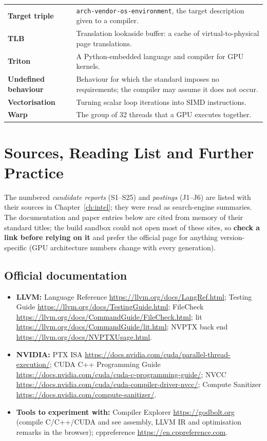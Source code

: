\documentclass[10pt,a4paper,openany,oneside]{report}
\begin{document}
\begin{center}
\begin{xltabular}{\textwidth}{@{}L{3.6cm}Y@{}}
\textbf{Target triple} & \texttt{arch-vendor-os-environment}, the target description given to a compiler.\\
\textbf{TLB} & Translation lookaside buffer: a cache of virtual-to-physical page translations.\\
\textbf{Triton} & A Python-embedded language and compiler for GPU kernels.\\
\textbf{Undefined behaviour} & Behaviour for which the standard imposes no requirements; the compiler may assume it does not occur.\\
\textbf{Vectorisation} & Turning scalar loop iterations into SIMD instructions.\\
\textbf{Warp} & The group of 32 threads that a GPU executes together.\\
\bottomrule
\end{xltabular}
\end{center}


\chapter{Sources, Reading List and Further Practice}
\label{app:read}

\begin{trapbox}
The numbered \emph{candidate reports} (S1--S25) and \emph{postings} (J1--J6) are listed with their sources in Chapter~\ref{ch:intel}; they were read as search-engine summaries. The documentation and paper entries below are cited from memory of their standard titles; the build sandbox could not open most of these sites, so \textbf{check a link before relying on it} and prefer the official page for anything version-specific (GPU architecture numbers change with every generation).
\end{trapbox}

\section{Official documentation}
\begin{itemize}[nosep]
\item \textbf{LLVM:} Language Reference \url{https://llvm.org/docs/LangRef.html}; Testing Guide \url{https://llvm.org/docs/TestingGuide.html}; FileCheck \url{https://llvm.org/docs/CommandGuide/FileCheck.html}; lit \url{https://llvm.org/docs/CommandGuide/lit.html}; NVPTX back end \url{https://llvm.org/docs/NVPTXUsage.html}.
\item \textbf{NVIDIA:} PTX ISA \url{https://docs.nvidia.com/cuda/parallel-thread-execution/}; CUDA C++ Programming Guide \url{https://docs.nvidia.com/cuda/cuda-c-programming-guide/}; NVCC \url{https://docs.nvidia.com/cuda/cuda-compiler-driver-nvcc/}; Compute Sanitizer \url{https://docs.nvidia.com/compute-sanitizer/}.
\item \textbf{Tools to experiment with:} Compiler Explorer \url{https://godbolt.org} (compile C/C++/CUDA and see assembly, LLVM IR and optimisation remarks in the browser); cppreference \url{https://en.cppreference.com}.
\end{itemize}
\end{document}
